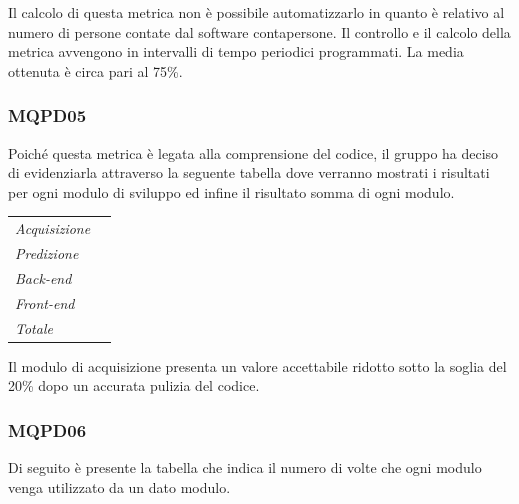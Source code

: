 {{{{{{{{{{{{{{{{{{%
Il calcolo di questa metrica non è possibile automatizzarlo in quanto è relativo al numero di persone contate dal software contapersone. Il controllo e il calcolo della metrica avvengono in intervalli di tempo periodici programmati. La media ottenuta è circa pari al 75\%.

\subsubsection{MQPD05}\label{ResocontoAttivitàDiVerificaRevisioneDiAccettazioneVerificheDiProcessoMQPD05}

Poiché questa metrica è legata alla comprensione del codice, il gruppo ha deciso di evidenziarla attraverso la seguente tabella dove verranno mostrati i risultati per ogni modulo di sviluppo ed infine il risultato somma di ogni modulo.

\quad
\def\tabularxcolumn#1{m{#1}}
{
\begin{center}
\renewcommand{\arraystretch}{1.4}
\begin{longtable}[c]{|p{4cm}|p{4cm}|} %
	\hline
	\rowcolor{airforceblue}
	\makecell[c]{\textbf{Modulo}} & \makecell[c]{\textbf{Valore metrica}}\\
	\hline
	\textit{Acquisizione} & \makecell[c]{17\%} \\
	\hline
	\textit{Predizione} & \makecell[c]{8\%}\\
	\hline
	\textit{Back-end} &  \makecell[c]{5\%}\\
	\hline
	\textit{Front-end} & \makecell[c]{0,2\%} \\
	\hline
	\textit{Totale} & \makecell[c]{5\%}\\
	\hline
\end{longtable}
\end{center}

Il modulo di acquisizione presenta un valore accettabile ridotto sotto la soglia del 20\% dopo un accurata pulizia del codice. 

\subsubsection{MQPD06}\label{ResocontoAttivitàDiVerificaRevisioneDiAccettazioneVerificheDiProcessoMQPD06}

Di seguito è presente la tabella che indica il numero di volte che ogni modulo venga utilizzato da un dato modulo.

}}}}}}}}}}}}}}}}}}}
